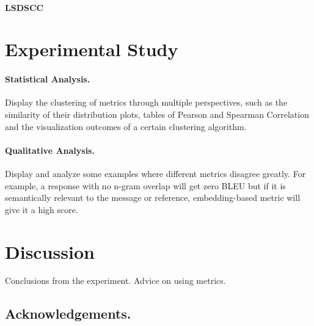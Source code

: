 \documentclass[runningheads]{llncs}
\begin{document}
    \paragraph{LSDSCC}


    \section{Experimental Study}
    \paragraph{Statistical Analysis.}
    Display the clustering of metrics through multiple perspectives,
    such as the similarity of their distribution plots, tables of Pearson and Spearman Correlation
    and the visualization outcomes of a certain clustering algorithm.

    \paragraph{Qualitative Analysis.}
    Display and analyze some examples where different metrics disagree greatly.
    For example, a response with no n-gram overlap will get zero BLEU but if it is semantically
    relevant to the message or reference, embedding-based metric will give it a high score.

    \section{Discussion}
    Conclusions from the experiment.
    Advice on using metrics.

    \subsection*{Acknowledgements.}

    
    
\end{document}
